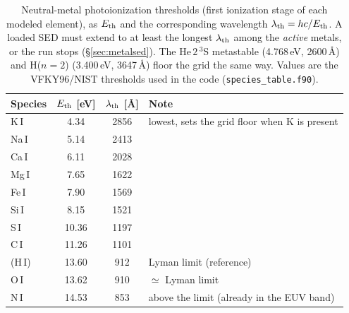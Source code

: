 \documentclass[english,a4paper]{my_memo}
\begin{document}
\begin{table}[htbp]\centering\small
\caption{Neutral-metal photoionization thresholds (first ionization stage of
each modeled element), as $E_{\rm th}$ and the corresponding wavelength
$\lambda_{\rm th}=hc/E_{\rm th}$. A loaded SED must extend to at least the
longest $\lambda_{\rm th}$ among the \emph{active} metals, or the run stops
(\S\ref{sec:metalsed}). The He\,$2\,^3$S metastable (4.768\,eV, 2600\,\AA) and
H($n{=}2$) (3.400\,eV, 3647\,\AA) floor the grid the same way. Values are the
VFKY96/NIST thresholds used in the code (\texttt{species\_table.f90}).}
\label{tab:metaledge}
\begin{tabular}{@{}lccl@{}}
\toprule
Species & $E_{\rm th}$ [eV] & $\lambda_{\rm th}$ [\AA] & Note \\
\midrule
K\,I  & 4.34  & 2856 & lowest, sets the grid floor when K is present \\
Na\,I & 5.14  & 2413 & \\
Ca\,I & 6.11  & 2028 & \\
Mg\,I & 7.65  & 1622 & \\
Fe\,I & 7.90  & 1569 & \\
Si\,I & 8.15  & 1521 & \\
S\,I  & 10.36 & 1197 & \\
C\,I  & 11.26 & 1101 & \\
\midrule
(H\,I) & 13.60 & 912 & Lyman limit (reference) \\
O\,I  & 13.62 & 910 & $\simeq$ Lyman limit \\
N\,I  & 14.53 & 853 & above the limit (already in the EUV band) \\
\bottomrule
\end{tabular}
\end{table}
\end{document}
